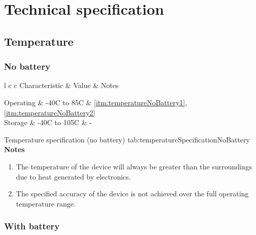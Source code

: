 \section{Technical specification}

\newcommand{\techincalTable}[5]{
    \customTable
    {l c c}
    {#1 & Value & Notes}
    {
        #2
    }
    {#3}
    {#4}
    \textbf{Notes}
    \begin{enumerate}[nolistsep]
        #5
    \end{enumerate}
}

\newcommand{\characteristicTable}[4]{
    \techincalTable
    {Characteristic}
    {#1}
    {#2}
    {#3}
    {#4}
}

\newcommand{\conditionTable}[4]{
    \techincalTable
    {Condition}
    {#1}
    {#2}
    {#3}
    {#4}
}

\subsection{Temperature}
\label{sec:temperature}

\newcommand{\noteHeat}{The temperature of the device will always be greater than the surroundings due to heat generated by electronics.}

\newcommand{\noteFullRange}{The specified accuracy of the device is not achieved over the full operating temperature range.  }

\subsubsection{No battery}

\characteristicTable
{
    Operating & -40\textdegree{}C to 85\textdegree{}C & \ref{itm:temperatureNoBattery1}, \ref{itm:temperatureNoBattery2}\\
    Storage & -40\textdegree{}C to 105\textdegree{}C & -\\
}
{Temperature specification (no battery)}
{tab:temperatureSpecificationNoBattery}
{
    \item \label{itm:temperatureNoBattery1} \noteHeat
    \item \label{itm:temperatureNoBattery2} \noteFullRange
}

\subsubsection{With battery}

